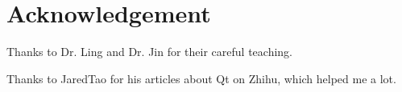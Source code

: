 \documentclass{article}
\begin{document}
\section{Acknowledgement}
Thanks to Dr. Ling and Dr. Jin for their careful teaching.

Thanks to JaredTao for his articles about Qt on Zhihu, which helped me a lot. 
\end{document}
